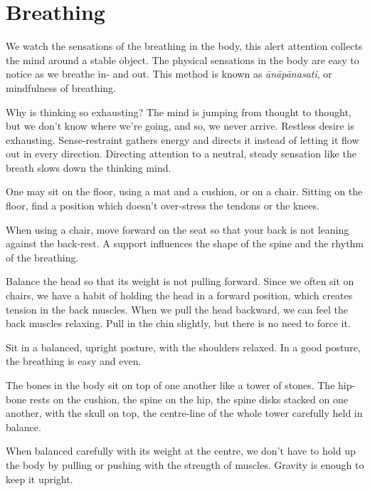 \chapter{Breathing}


\noindent We watch the sensations of the breathing in the body, this
alert attention collects the mind around a stable object. The physical
sensations in the body are easy to notice as we breathe in- and out.
This method is known as \emph{ānāpānasati}, or mindfulness of breathing.

Why is thinking so exhausting? The mind is jumping from thought to
thought, but we don't know where we're going, and so, we never arrive.
Restless desire is exhausting. Sense-restraint gathers energy and
directs it instead of letting it flow out in every direction. Directing
attention to a neutral, steady sensation like the breath slows down the
thinking mind.

One may sit on the floor, using a mat and a cushion, or on a chair.
Sitting on the floor, find a position which doesn't over-stress the
tendons or the knees.

When using a chair, move forward on the seat so that your back is not
leaning against the back-rest. A support influences the shape of the
spine and the rhythm of the breathing.

\enlargethispage*{\baselineskip}

Balance the head so that its weight is not pulling forward. Since we
often sit on chairs, we have a habit of holding the head in a forward
position, which creates tension in the back muscles. When we pull the
head backward, we can feel the back muscles relaxing. Pull in the chin
slightly, but there is no need to force it.

\clearpage
\thispagestyle{empty}\mbox{}
\clearpage

Sit in a balanced, upright posture, with the shoulders relaxed. In a
good posture, the breathing is easy and even.

The bones in the body sit on top of one another like a tower of stones.
The hip-bone rests on the cushion, the spine on the hip, the spine disks
stacked on one another, with the skull on top, the centre-line of the
whole tower carefully held in balance.

When balanced carefully with its weight at the centre, we don't have to
hold up the body by pulling or pushing with the strength of muscles.
Gravity is enough to keep it upright.

